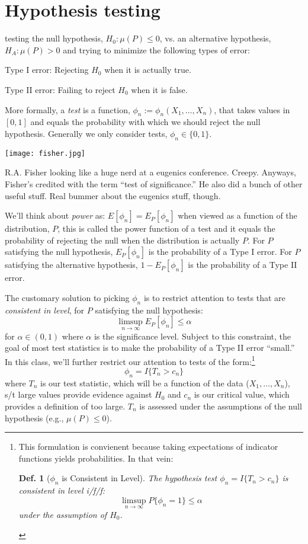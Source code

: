 \documentclass{tufte-book}
\theoremstyle{mytheoremstyle}
\theoremstyle{mylemstyle}
\theoremstyle{mydefstyle}
\newtheorem*{mydef}{Def.}
\begin{document}
\section{Hypothesis testing}
 testing the null hypothesis, \(H_0: \mu(P) \le 0\), vs. an alternative hypothesis, \(H_A: \mu(P) > 0\) and trying to minimize the following types of error:
	\begin{description}
		\item Type I error: Rejecting \(H_0\) when it is actually true.
		\item Type II error: Failing to reject \(H_0\) when it is false. 
	\end{description}
More formally, a \emph{test} is a function, \(\phi_n := \phi_n(X_1, \dots, X_n)\), that takes values in \([0, 1]\) and equals the probability with which we should reject the null hypothesis. Generally we only consider tests, \(\phi_n \in \{0, 1\}\). 

\begin{marginfigure} \texttt{[image: fisher.jpg]} \caption{R.A. Fisher looking like a huge nerd at a eugenics conference. Creepy. Anyways, Fisher's credited with the term ``test of significance.'' He also did a bunch of other useful stuff. Real bummer about the eugenics stuff, though.}  \end{marginfigure}
We'll think about \emph{power} as: \(E[\phi_n] = E_P[\phi_n]\) when viewed as a function of the distribution, \(P\), this is called the power function of a test and it equals the probability of rejecting the null when the distribution is actually \(P\). For \(P\) satisfying the null hypothesis, \(E_P[\phi_n]\) is the probability of a Type I error. For \(P\) satisfying the alternative hypothesis, \(1-E_P[\phi_n]\) is the probability of a Type II error. 

The customary solution to picking \(\phi_n\) is to restrict attention to tests that are \emph{consistent in level}, for \(P\) satisfying the null hypothesis:
	\[\limsup_{n \rightarrow \infty} E_P[\phi_n] \le \alpha\]
for \(\alpha \in (0, 1)\) where \(\alpha\) is the significance level. Subject to this constraint, the goal of most test statistics is to make the probability of a Type II error ``small.'' In this class, we'll further restrict our attention to tests of the form:\footnote{This formulation is convienent because taking expectations of indicator functions yields probabilities. In that vein: 
\begin{mydef}[\(\phi_n\) is Consistent in Level] The hypothesis test \(\phi_n =  I\{T_n > c_n\}\) is consistent in level i/f/f:
	\[\limsup_{n \rightarrow \infty} P\{\phi_n = 1\} \le \alpha\]
under the assumption of \(H_0\). 
\end{mydef} }
	\[\phi_n = I\{T_n > c_n\}\]
where \(T_n\) is our test statistic, which will be a function of the data (\(X_1, \dots, X_n\)), s/t large values provide evidence against \(H_0\) and \(c_n\) is our critical value, which provides a definition of too large. \(T_n\) is assessed under the assumptions of the null hypothesis (e.g., \(\mu(P) \le 0\)).
\end{document}
